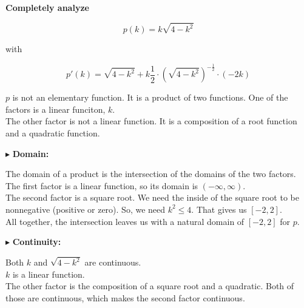 \documentclass{ximera}
\begin{document}
\begin{example}


\textbf{\textcolor{purple!85!blue}{Completely analyze}}

\[
p(k) = k \sqrt{4-k^2}
\]


with


\[
p'(k) = \sqrt{4-k^2} + k \frac{1}{2} \cdot (\sqrt{4-k^2})^{-\tfrac{1}{2}} \cdot (-2k)
\]

\begin{remark}

$p$ is not an elementary function.  It is a product of two functions. One of the factors is a linear funciton, $k$. \\

The other factor is not a linear function.  It is a composition of a root function and a quadratic function. \\

\end{remark}




$\blacktriangleright$  \textbf{\textcolor{blue!55!black}{Domain:}} 

The domain of a product is the intersection of the domains of the two factors. \\

The first factor is a linear function, so its domain is $(-\infty, \infty)$. \\

The second factor is a square root. We need the inside of the square root to be nonnegative (positive or zero).  So, we need $k^2 \leq 4$. That gives us $[-2, 2]$. \\




All together, the intersection leaves us with a natural domain of $[-2, 2]$ for $p$.





$\blacktriangleright$  \textbf{\textcolor{blue!55!black}{Continuity:}} 

Both $k$ and $\sqrt{4 - k^2}$ are continuous. \\


$k$ is a linear function. \\


The other factor is the composition of a square root and a quadratic. Both of those are continuous, which makes the second factor continuous. \\




\end{example}
\end{document}
